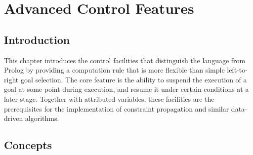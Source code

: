 %
% 
% 
% 
% 
%
%

\chapter{Advanced Control Features}
\label{suspensions}

\section{Introduction}
This chapter introduces the control facilities that distinguish the
{\eclipse} language from Prolog by providing a computation
rule that is more flexible than simple left-to-right goal selection.
The core feature is the ability to suspend the execution of a goal
at some point during execution, and resume it under certain conditions
at a later stage.
Together with attributed variables, these facilities are the
prerequisites for the implementation of constraint propagation
and similar data-driven algorithms.

% 

\section{Concepts}
